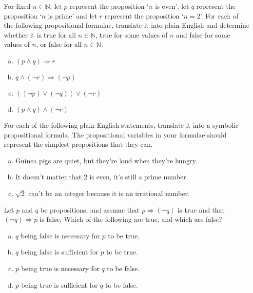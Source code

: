 \begin{chapex}
\label{cqTranslatePropositionalFormulaeToEnglish}
For fixed $n \in \mathbb{N}$, let $p$ represent the proposition `$n$ is even', let $q$ represent the proposition `$n$ is prime' and let $r$ represent the proposition `$n = 2$'. For each of the following propositional formulae, translate it into plain English and determine whether it is true for all $n \in \mathbb{N}$, true for some values of $n$ and false for some values of $n$, or false for all $n \in \mathbb{N}$.

\begin{enumerate}[(a)]
\item $(p \wedge q) \Rightarrow r$
\item $q \wedge (\neg r) \Rightarrow (\neg p)$
\item $((\neg p) \vee (\neg q)) \vee (\neg r)$
\item $(p \wedge q) \wedge (\neg r)$
\end{enumerate}
\end{chapex}

\begin{chapex}
For each of the following plain English statements, translate it into a symbolic propositional formula. The propositional variables in your formulae should represent the simplest propositions that they can.
\begin{enumerate}[(a)]
\item Guinea pigs are quiet, but they're loud when they're hungry.
\item It doesn't matter that $2$ is even, it's still a prime number.
\item $\sqrt{2}$ can't be an integer because it is an irrational number.
\end{enumerate}
\end{chapex}

\begin{chapex}
Let $p$ and $q$ be propositions, and assume that $p \Rightarrow (\neg q)$ is true and that $(\neg q) \Rightarrow p$ is false. Which of the following are true, and which are false?
\begin{enumerate}[(a)]
\item $q$ being false is necessary for $p$ to be true.
\item $q$ being false is sufficient for $p$ to be true.
\item $p$ being true is necessary for $q$ to be false.
\item $p$ being true is sufficient for $q$ to be false.
\end{enumerate}
\end{chapex}

